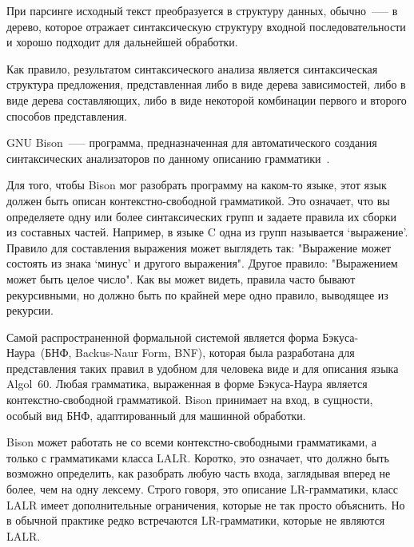 При парсинге исходный текст преобразуется в структуру данных,
обычно~--— в дерево, которое отражает синтаксическую структуру входной
последовательности и хорошо подходит для дальнейшей обработки.

Как правило, результатом синтаксического анализа является
синтаксическая структура предложения, представленная либо в виде
дерева зависимостей, либо в виде дерева составляющих, либо в виде
некоторой комбинации первого и второго способов представления.

GNU Bison~--— программа, предназначенная для автоматического создания
синтаксических анализаторов по данному описанию
грамматики~\cite{bison}.

Для того, чтобы Bison мог разобрать программу на каком-то языке, этот
язык должен быть описан контекстно-свободной грамматикой.  Это
означает, что вы определяете одну или более синтаксических групп и
задаете правила их сборки из составных частей.  Например, в языке C
одна из групп называется `выражение'.  Правило для составления
выражения может выглядеть так: "Выражение может состоять из знака
`минус' и другого выражения".  Другое правило: "Выражением может быть
целое число".  Как вы может видеть, правила часто бывают рекурсивными,
но должно быть по крайней мере одно правило, выводящее из рекурсии.

Самой распространенной формальной системой является форма
Бэкуса-Наура~(БНФ, Backus-Naur Form, BNF), которая была разработана
для представления таких правил в удобном для человека виде и для
описания языка Algol~60.  Любая грамматика, выраженная в форме
Бэкуса-Наура является контекстно-свободной грамматикой.  Bison
принимает на вход, в сущности, особый вид БНФ, адаптированный для
машинной обработки.

Bison может работать не со всеми контекстно-свободными грамматиками, а
только с грамматиками класса LALR.  Коротко, это означает, что должно
быть возможно определить, как разобрать любую часть входа, заглядывая
вперед не более, чем на одну лексему.  Строго говоря, это описание
LR-грамматики, класс LALR имеет дополнительные ограничения, которые не
так просто объяснить.  Но в обычной практике редко встречаются
LR-грамматики, которые не являются LALR.




